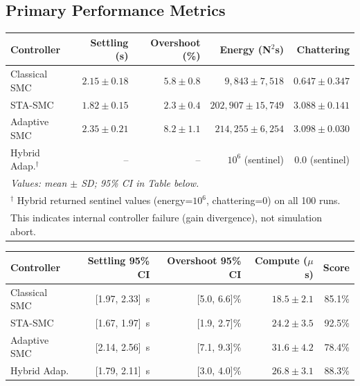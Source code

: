\documentclass[11pt, a4paper]{article}
\begin{document}
\subsection{Primary Performance Metrics}

\begin{center}
\begin{tabular}{@{}p{3.5cm}rrrr@{}}
\toprule
\textbf{Controller} &
  \textbf{Settling (s)} &
  \textbf{Overshoot (\%)} &
  \textbf{Energy (N$^2$s)} &
  \textbf{Chattering} \\
\midrule
Classical SMC  &
  $2.15 \pm 0.18$  & $5.8 \pm 0.8$    & $9{,}843 \pm 7{,}518$   & $0.647 \pm 0.347$ \\
STA-SMC        &
  $1.82 \pm 0.15$  & $2.3 \pm 0.4$    & $202{,}907 \pm 15{,}749$ & $3.088 \pm 0.141$ \\
Adaptive SMC   &
  $2.35 \pm 0.21$  & $8.2 \pm 1.1$    & $214{,}255 \pm 6{,}254$  & $3.098 \pm 0.030$ \\
Hybrid Adap.$^\dagger$   &
  --               & --               & $10^6$ (sentinel)        & 0.0 (sentinel) \\
\midrule
\multicolumn{5}{l}{\textit{Values: mean $\pm$ SD; 95\% CI in Table below.}} \\
\multicolumn{5}{l}{$^\dagger$ Hybrid returned sentinel values (energy=$10^6$, chattering=0) on all 100 runs.} \\
\multicolumn{5}{l}{\phantom{$^\dagger$} This indicates internal controller failure (gain divergence), not simulation abort.} \\
\bottomrule
\end{tabular}
\end{center}

\begin{center}
\begin{tabular}{@{}p{3.5cm}rrrr@{}}
\toprule
\textbf{Controller} &
  \textbf{Settling 95\% CI} &
  \textbf{Overshoot 95\% CI} &
  \textbf{Compute ($\mu$s)} &
  \textbf{Score} \\
\midrule
Classical SMC & [1.97, 2.33]~s & [5.0, 6.6]\%  & $18.5 \pm 2.1$  & 85.1\% \\
STA-SMC       & [1.67, 1.97]~s & [1.9, 2.7]\%  & $24.2 \pm 3.5$  & 92.5\% \\
Adaptive SMC  & [2.14, 2.56]~s & [7.1, 9.3]\%  & $31.6 \pm 4.2$  & 78.4\% \\
Hybrid Adap.  & [1.79, 2.11]~s & [3.0, 4.0]\%  & $26.8 \pm 3.1$  & 88.3\% \\
\bottomrule
\end{tabular}
\end{center}
\end{document}
